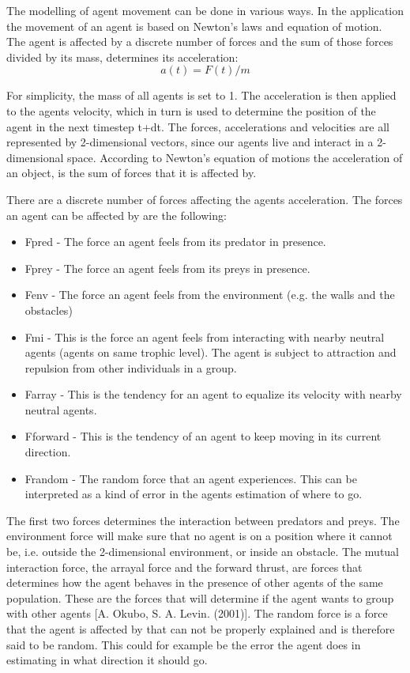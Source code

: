 \documentclass[paper=a4, fontsize=11pt,twoside]{scrartcl}		%
\begin{document}
\begin{flushleft}
The modelling of agent movement can be done in various ways. In the application the movement of an agent is based on Newton’s laws and equation of motion. The agent is affected by a discrete number of forces and the sum of those forces divided by its mass, determines its acceleration: $$a(t) = F(t)/m$$

For simplicity, the mass of all agents is set to 1. The acceleration is then applied to the agents velocity, which in turn is used to determine the position of the agent in the next timestep t+dt. The forces, accelerations and velocities are all represented by 2-dimensional vectors, since our agents live and interact in a 2-dimensional space. According to Newton's equation of motions the acceleration of an object, is the sum of forces that it is affected by. \newline

There are a discrete number of forces affecting the agents acceleration. The forces an agent can be affected by are the following: \newline

\begin{itemize}
\item Fpred - The force an agent feels from its predator in presence.
\item Fprey - The force an agent feels from its preys in presence.
\item Fenv - The force an agent feels from the environment (e.g. the walls and the obstacles)
\item Fmi - This is the force an agent feels from interacting with nearby neutral agents (agents on same trophic level). The agent is subject to attraction and repulsion from other individuals in a group.
\item Farray - This is the tendency for an agent to equalize its velocity with nearby neutral agents.
\item Fforward - This is the tendency of an agent to keep moving in its current direction.
\item Frandom - The random force that an agent experiences. This can be interpreted as a kind of error in the agents estimation of where to go.
\end{itemize}

The first two forces determines the interaction between predators and preys. The environment force will make sure that no agent is on a position where it cannot be, i.e. outside the 2-dimensional environment, or inside an obstacle. The mutual interaction force, the arrayal force and the forward thrust, are forces that determines how the agent behaves in the presence of other agents of the same population. These are the forces that will determine if the agent wants to group with other agents [A. Okubo, S. A. Levin. (2001)]. The random force is a force that the agent is affected by that can not be properly explained and is therefore said to be random. This could for example be the error the agent does in estimating in what direction it should go. \newline


\end{flushleft}
\end{document}
